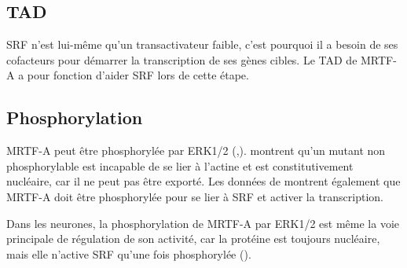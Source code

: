  
 
 
 \subsection{TAD}
 
 SRF n'est lui-même qu'un transactivateur faible, c'est pourquoi il a besoin de ses cofacteurs pour démarrer la transcription de ses gènes cibles. Le TAD de MRTF-A a pour fonction d'aider SRF lors de cette étape. 
 
 
 
 \subsection{Phosphorylation}
	MRTF-A peut être phosphorylée par ERK1/2 (\cite{miralles_actin_2003},\cite{cen_myocardin/mkl_2004}). \cite{muehlich_serum-induced_2008} montrent qu'un mutant non phosphorylable est incapable de se lier à l'actine et est constitutivement nucléaire, car il ne peut pas être exporté. Les données de \cite{kalita_role_2006} montrent également que MRTF-A doit être phosphorylée pour se lier à SRF et activer la transcription.
	
	Dans les neurones, la phosphorylation de MRTF-A par ERK1/2 est même la voie principale de régulation de son activité, car la protéine est toujours nucléaire, mais elle n'active SRF qu'une fois phosphorylée (\cite{kalita_role_2006}). 
	
